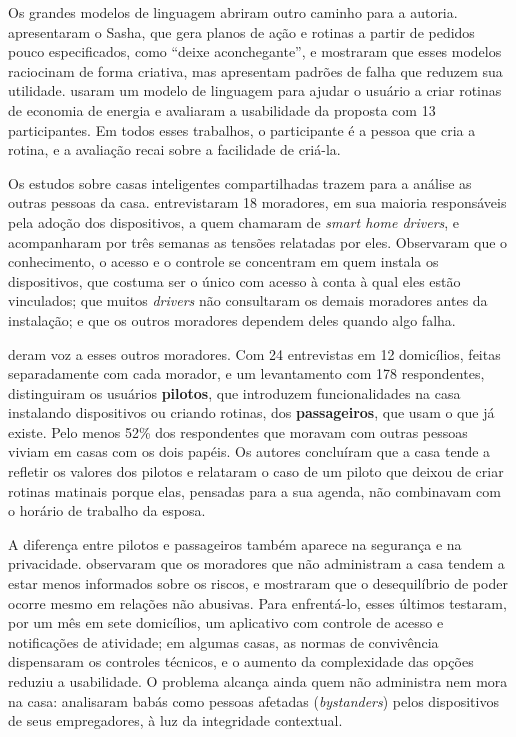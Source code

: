 Os grandes modelos de linguagem abriram outro caminho para a autoria.
\citet{king2024sasha} apresentaram o Sasha, que gera planos de ação e
rotinas a partir de pedidos pouco especificados, como ``deixe
aconchegante'', e mostraram que esses modelos raciocinam de forma
criativa, mas apresentam padrões de falha que reduzem sua utilidade.
\citet{giudici2024greenifttt} usaram um modelo de linguagem para ajudar o
usuário a criar rotinas de economia de energia e avaliaram a usabilidade
da proposta com 13 participantes. Em todos esses trabalhos, o
participante é a pessoa que cria a rotina, e a avaliação recai sobre a
facilidade de criá-la.

Os estudos sobre casas inteligentes compartilhadas trazem para a análise
as outras pessoas da casa. \citet{geeng2019control} entrevistaram 18
moradores, em sua maioria responsáveis pela adoção dos dispositivos, a
quem chamaram de \textit{smart home drivers}, e acompanharam por três
semanas as tensões relatadas por eles. Observaram que o conhecimento, o
acesso e o controle se concentram em quem instala os dispositivos, que
costuma ser o único com acesso à conta à qual eles estão vinculados; que
muitos \textit{drivers} não consultaram os demais moradores antes da
instalação; e que os outros moradores dependem deles quando algo falha.

\citet{koshy2021passenger} deram voz a esses outros moradores. Com 24
entrevistas em 12 domicílios, feitas separadamente com cada morador, e um
levantamento com 178 respondentes, distinguiram os usuários
\textbf{pilotos}, que introduzem funcionalidades na casa instalando
dispositivos ou criando rotinas, dos \textbf{passageiros}, que usam o que
já existe. Pelo menos 52\% dos respondentes que moravam com outras
pessoas viviam em casas com os dois papéis. Os autores concluíram que a
casa tende a refletir os valores dos pilotos e relataram o caso de um
piloto que deixou de criar rotinas matinais porque elas, pensadas para a
sua agenda, não combinavam com o horário de trabalho da esposa.

A diferença entre pilotos e passageiros também aparece na segurança e na
privacidade. \citet{zeng2017concerns} observaram que os moradores que não
administram a casa tendem a estar menos informados sobre os riscos, e
\citet{zeng2019multiuser} mostraram que o desequilíbrio de poder ocorre
mesmo em relações não abusivas. Para enfrentá-lo, esses últimos
testaram, por um mês em sete domicílios, um aplicativo com controle de
acesso e notificações de atividade; em algumas casas, as normas de
convivência dispensaram os controles técnicos, e o aumento da
complexidade das opções reduziu a usabilidade. O problema alcança ainda
quem não administra nem mora na casa: \citet{bernd2020bystanders}
analisaram babás como pessoas afetadas (\textit{bystanders}) pelos
dispositivos de seus empregadores, à luz da integridade contextual.

